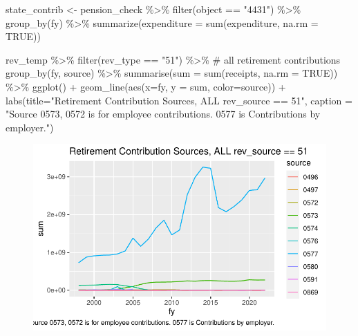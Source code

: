 \documentclass[
  letterpaper,
  DIV=11,
  numbers=noendperiod]{scrreport}
\newenvironment{Shaded}{\begin{snugshade}}{\end{snugshade}}
\newcommand{\AttributeTok}[1]{\textcolor[rgb]{0.40,0.45,0.13}{#1}}
\newcommand{\CommentTok}[1]{\textcolor[rgb]{0.37,0.37,0.37}{#1}}
\newcommand{\ConstantTok}[1]{\textcolor[rgb]{0.56,0.35,0.01}{#1}}
\newcommand{\FunctionTok}[1]{\textcolor[rgb]{0.28,0.35,0.67}{#1}}
\newcommand{\NormalTok}[1]{\textcolor[rgb]{0.00,0.23,0.31}{#1}}
\newcommand{\OtherTok}[1]{\textcolor[rgb]{0.00,0.23,0.31}{#1}}
\newcommand{\SpecialCharTok}[1]{\textcolor[rgb]{0.37,0.37,0.37}{#1}}
\newcommand{\StringTok}[1]{\textcolor[rgb]{0.13,0.47,0.30}{#1}}
\begin{document}
\begin{Shaded}
\begin{Highlighting}[]
\NormalTok{state\_contrib }\OtherTok{\textless{}{-}}\NormalTok{ pension\_check }\SpecialCharTok{\%\textgreater{}\%} \FunctionTok{filter}\NormalTok{(object }\SpecialCharTok{==} \StringTok{"4431"}\NormalTok{) }\SpecialCharTok{\%\textgreater{}\%}
  \FunctionTok{group\_by}\NormalTok{(fy) }\SpecialCharTok{\%\textgreater{}\%} 
  \FunctionTok{summarize}\NormalTok{(}\AttributeTok{expenditure =} \FunctionTok{sum}\NormalTok{(expenditure, }\AttributeTok{na.rm =} \ConstantTok{TRUE}\NormalTok{))}



\NormalTok{rev\_temp }\SpecialCharTok{\%\textgreater{}\%} 
  \FunctionTok{filter}\NormalTok{(rev\_type }\SpecialCharTok{==} \StringTok{"51"}\NormalTok{) }\SpecialCharTok{\%\textgreater{}\%} \CommentTok{\# all retirement contributions}
  \FunctionTok{group\_by}\NormalTok{(fy, source) }\SpecialCharTok{\%\textgreater{}\%} 
  \FunctionTok{summarise}\NormalTok{(}\AttributeTok{sum =} \FunctionTok{sum}\NormalTok{(receipts, }\AttributeTok{na.rm =} \ConstantTok{TRUE}\NormalTok{)) }\SpecialCharTok{\%\textgreater{}\%}
  \FunctionTok{ggplot}\NormalTok{() }\SpecialCharTok{+}
  \FunctionTok{geom\_line}\NormalTok{(}\FunctionTok{aes}\NormalTok{(}\AttributeTok{x=}\NormalTok{fy, }\AttributeTok{y =}\NormalTok{ sum, }\AttributeTok{color=}\NormalTok{source)) }\SpecialCharTok{+} \FunctionTok{labs}\NormalTok{(}\AttributeTok{title=}\StringTok{"Retirement Contribution Sources, ALL rev\_source == 51"}\NormalTok{, }
       \AttributeTok{caption =} \StringTok{"Source 0573, 0572 is for employee contributions. 0577 is Contributions by employer."}\NormalTok{)}
\end{Highlighting}
\end{Shaded}

\begin{figure}[H]

{\centering \includegraphics{./Pensions_files/figure-pdf/unnamed-chunk-3-1.pdf}

}

\end{figure}
\end{document}
